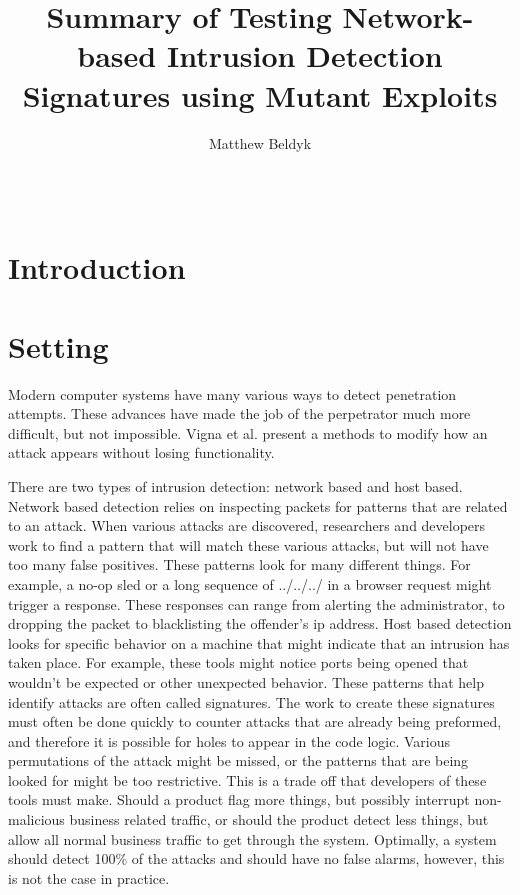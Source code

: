 \documentclass{reading_glasses}
\begin{document}
\title{Summary of Testing Network-based Intrusion Detection Signatures using Mutant Exploits}

%
\author{
    \alignauthor
    Matthew Beldyk\\
    \\
    \\
}
\maketitle
\begin{abstract}
\end{abstract}

\section{Introduction}

\section{Setting}
Modern computer systems have many various ways to detect penetration attempts.  These advances have made the job of the perpetrator much more difficult, but not impossible. Vigna et al. present a methods to modify how an attack appears without losing functionality.  \cite{vigna2004testing}

There are two types of intrusion detection: network based and host based.  Network based detection relies on inspecting packets for patterns that are related to an attack.  When various attacks are discovered, researchers and developers work to find a pattern that will match these various attacks, but will not have too many false positives.  These patterns look for many different things.  For example, a no-op sled or a long sequence of ../../../ in a browser request might trigger a response.  These responses can range from alerting the administrator, to dropping the packet to blacklisting the offender's ip address.  Host based detection looks for specific behavior on a machine that might indicate that an intrusion has taken place.  For example, these tools might notice ports being opened that wouldn't be expected or other unexpected behavior. These patterns that help identify attacks are often called signatures.  The work to create these signatures must often be done quickly to counter attacks that are already being preformed, and therefore it is possible for holes to appear in the code logic.  Various permutations of the attack might be missed, or the patterns that are being looked for might be too restrictive.   This is a trade off that developers of these tools must make.  Should a product flag more things, but possibly interrupt non-malicious business related traffic, or should the product detect less things, but allow all normal business traffic to get through the system.  Optimally, a system should detect 100\% of the attacks and should have no false alarms, however, this is not the case in practice. \cite{vigna2004testing}
\end{document}

